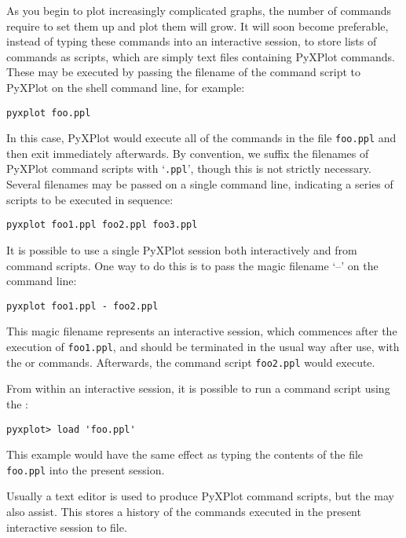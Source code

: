 As you begin to plot increasingly complicated graphs, the number of commands
require to set them up and plot them will grow.  It will soon become
preferable, instead of typing these commands into an interactive session, to
store lists of commands as scripts, which are simply text files containing
PyXPlot commands. These may be executed by passing the filename of the command
script to PyXPlot on the shell command line, for example:

\begin{verbatim}
pyxplot foo.ppl
\end{verbatim}

\noindent In this case, PyXPlot would execute all of the commands in the file
{\tt foo.ppl} and then exit immediately afterwards.  By convention, we suffix
the filenames of PyXPlot command scripts with `{\tt .ppl}', though this is not
strictly necessary. Several filenames may be passed on a single command line,
indicating a series of scripts to be executed in sequence:

\begin{verbatim}
pyxplot foo1.ppl foo2.ppl foo3.ppl
\end{verbatim}

It is possible to use a single PyXPlot session both interactively and from
command scripts. One way to do this is to pass the magic filename `--' on the
command line:

\begin{verbatim}
pyxplot foo1.ppl - foo2.ppl
\end{verbatim}

\noindent This magic filename represents an interactive session, which
commences after the execution of {\tt foo1.ppl}, and should be terminated in
the usual way after use, with the  or  commands.
Afterwards, the command script {\tt foo2.ppl} would execute.

From within an interactive session, it is possible to run a command script
using the :

\begin{verbatim}
pyxplot> load 'foo.ppl'
\end{verbatim}

\noindent This example would have the same effect as typing the contents of the
file {\tt foo.ppl} into the present session.

Usually a text editor is used to produce PyXPlot command scripts, but the
 may also assist. This stores a history of the commands executed
in the present interactive session to file.

